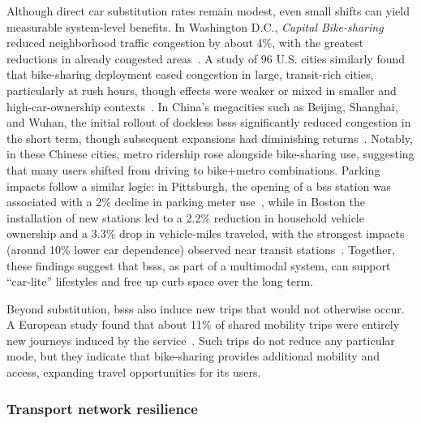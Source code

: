 Although direct car substitution rates remain modest, even small shifts can yield measurable system-level benefits. In Washington D.C., \textit{Capital Bike-sharing} reduced neighborhood traffic congestion by about 4\%, with the greatest reductions in already congested areas~\cite{Hamilton2018}. A study of 96 U.S. cities similarly found that bike-sharing deployment eased congestion in large, transit-rich cities, particularly at rush hours, though effects were weaker or mixed in smaller and high-car-ownership contexts~\cite{Wang2017}. In China’s megacities such as Beijing, Shanghai, and Wuhan, the initial rollout of dockless \acp{bss} significantly reduced congestion in the short term, though subsequent expansions had diminishing returns~\cite{Xu2024}. Notably, in these Chinese cities, metro ridership rose alongside bike-sharing use, suggesting that many users shifted from driving to bike+metro combinations. Parking impacts follow a similar logic: in Pittsburgh, the opening of a \ac{bss} station was associated with a 2\% decline in parking meter use~\cite{Pelechrinis2016}, while in Boston the installation of new stations led to a 2.2\% reduction in household vehicle ownership and a 3.3\% drop in vehicle-miles traveled, with the strongest impacts (around 10\% lower car dependence) observed near transit stations~\cite{Basu2021}. Together, these findings suggest that \acp{bss}, as part of a multimodal system, can support “car-lite” lifestyles and free up curb space over the long term.  

Beyond substitution, \acp{bss} also induce new trips that would not otherwise occur. A European study found that about 11\% of shared mobility trips were entirely new journeys induced by the service~\cite{Bosehans2024}. Such trips do not reduce any particular mode, but they indicate that bike-sharing provides additional mobility and access, expanding travel opportunities for its users. 

    \subsubsection{Transport network resilience}

